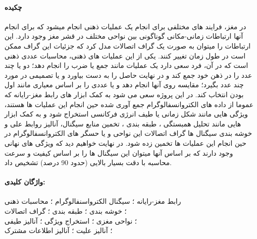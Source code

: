 \documentclass[11pt]{extarticle}
\begin{document}

%



\clearpage
\newpage
\paragraph{چکیده}

\paragraph{}
در مغز، فرایند های مختلفی برای انجام یک عملیات ذهنی انجام میشود که برای انجام آنها ارتباطات زمانی-مکانی گوناگونی بین نواحی مختلف در قشر مغز
 وجود دارد. این ارتباطات را میتوان به صورت یک گراف اتصالات مدل کرد که جزئیات این گراف ممکن است در طول زمان تغییر کنند. یکی از این عملیات های ذهنی، محاسبات عددی ذهنی
است که در آن، فرد سعی دارد یک عملیات مانند جمع یا ضرب را انجام دهد؛ دو یا چند عدد را در ذهن خود جمع کند و در نهایت حاصل را به دست بیاورد و یا تصمیمی در مورد چند عدد بگیرد؛ مقایسه روی آنها انجام دهد و یا عددی را بر اساس معیاری مانند اول بودن انتخاب کند. در این پروژه سعی می شود به کمک ابزار های رابط مغز-رایانه
 که عموما از داده های الکتروانسفالوگرام
 جمع آوری شده حین انجام این عملیات ها هستند، ویژگی هایی مانند شکل زمانی یا طیف انرژی فرکانسی استخراج شود 
 و به کمک ابزار هایی مانند تحلیل همبستگی ، طبقه بندی 
 ، تخمین منابع سیگنال، آنالیز روابط علی 
  و خوشه بندی سیگنال ها
  گراف اتصالات
  این نواحی و یا حسگر های الکتروانسفالوگرام در حین انجام این عملیات ها تخمین زده شود. در نهایت خواهیم دید که ویژگی های نهانی وجود دارند که بر اساس آنها میتوان این سیگنال ها را بر اساس کیفیت و سرعت محاسبه با دقت بسیار بالایی (حدود 90 درصد) تشخیص داد.
 
 \paragraph{واژگان کلیدی:}
 \paragraph{}
 رابط مغز-رایانه
 ؛ سیگنال الکترواسنفالوگرام
 ؛ محاسبات ذهنی
 \\
 ؛ خوشه بندی
 ؛ طبقه بندی
 ؛ گراف اتصالات
 \\
 ؛ نواحی مغزی
 ؛ استخراج ویژگی
 ؛ آنالیز طیفی
 \\
 ؛ آنالیز علیت
 ؛ آنالیز اطلاعات مشترک
\end{document}
